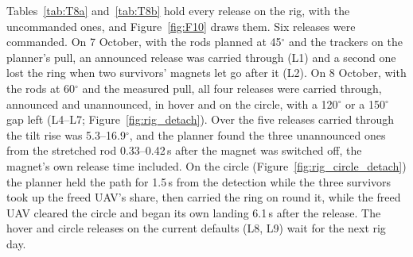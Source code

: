 Tables~\ref{tab:T8a} and~\ref{tab:T8b} hold every release on the rig, with the uncommanded ones, and
Figure~\ref{fig:F10} draws them. Six releases were commanded. On 7 October, with the rods planned at 45$^\circ$ and
the trackers on the planner's pull, an announced release was carried through (L1) and a second one lost the ring
when two survivors' magnets let go after it (L2). On 8 October, with the rods at 60$^\circ$ and the measured pull, all
four releases were carried through, announced and unannounced, in hover and on the circle, with a 120$^\circ$ or a
150$^\circ$ gap left (L4--L7; Figure~\ref{fig:rig_detach}). Over the five releases carried through the tilt rise was
5.3--16.9$^\circ$, and the planner found the three unannounced ones from the stretched rod 0.33--0.42\,s after the
magnet was switched off, the magnet's own release time included. On the circle (Figure~\ref{fig:rig_circle_detach})
the planner held the path for 1.5\,s from the detection while the three survivors took up the freed UAV's share, then
carried the ring on round it, while the freed UAV cleared the circle and began its own landing 6.1\,s after the
release. The hover and circle releases on the current defaults (L8, L9) wait for the next rig day.


